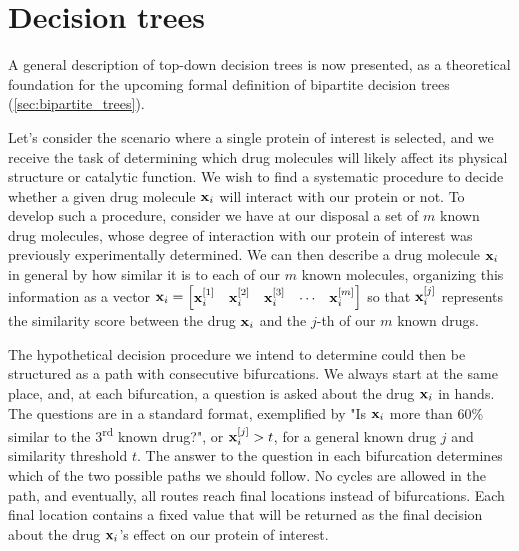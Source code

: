 \section{Decision trees}
\label{sec:dt}

A general description of top-down decision trees is now presented, as a theoretical foundation for the upcoming formal definition of bipartite decision trees (\autoref{sec:bipartite_trees}).

Let's consider the scenario where a single protein of interest is selected, and we receive the task of determining which drug molecules will likely affect its physical structure or catalytic function.
We wish to find a systematic procedure to decide whether a given drug molecule $\mathbf{x}_i$ will interact with our protein or not. To develop such a procedure, consider we have at our disposal a set of $m$ known drug molecules, whose degree of interaction with our protein of interest was previously experimentally determined. We can then describe a drug molecule $\mathbf{x}_i$ in general by how similar it is to each of our $m$ known molecules, organizing this information as a vector $\mathbf{x}_i = \begin{bmatrix}\mathbf{x}_i^{[1]} & \mathbf{x}_i^{[2]} & \mathbf{x}_i^{[3]} & \cdots & \mathbf{x}_i^{[m]}\end{bmatrix}$ so that $\mathbf{x}_i^{[j]}$ represents the similarity score between the drug $\mathbf{x}_i$ and the $j$-th of our $m$ known drugs.

The hypothetical decision procedure we intend to determine could then be structured as a path with consecutive bifurcations. We always start at the same place, and, at each bifurcation, a question is asked about the drug $\mathbf{x}_i$ in hands. The questions are in a standard format, exemplified by "Is $\mathbf{x}_i$ more than 60\% similar to the 3\textsuperscript{rd} known drug?", or $\mathbf{x}_i^{[j]} > t$, for a general known drug $j$ and similarity threshold $t$. The answer to the question in each bifurcation determines which of the two possible paths we should follow. No cycles are allowed in the path, and eventually, all routes reach final locations instead of bifurcations. Each final location contains a fixed value that will be returned as the final decision about the drug $\mathbf{x}_i$'s effect on our protein of interest.

